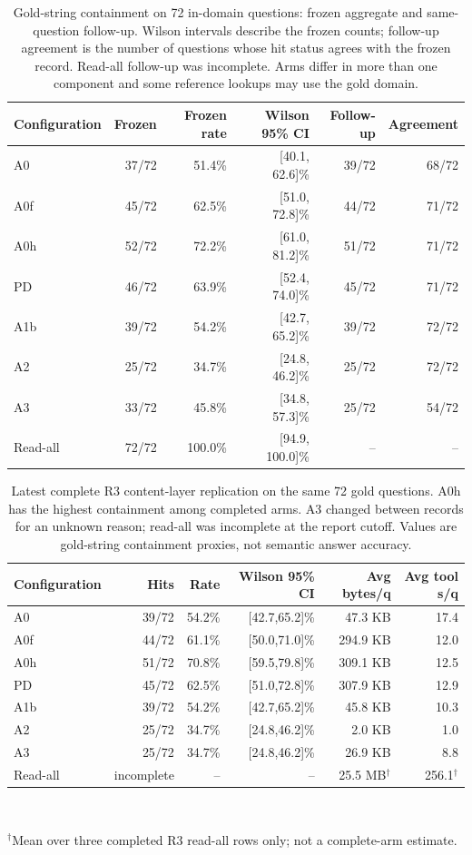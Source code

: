\begin{table}[t]
\centering\small
\caption{Gold-string containment on 72 in-domain questions: frozen aggregate and same-question follow-up. Wilson intervals describe the frozen counts; follow-up agreement is the number of questions whose hit status agrees with the frozen record. Read-all follow-up was incomplete. Arms differ in more than one component and some reference lookups may use the gold domain.}
\label{tab:s-arm-data}
\begin{tabular}{lrrrrr}
\toprule
Configuration & Frozen & Frozen rate & Wilson 95\% CI & Follow-up & Agreement \\
\midrule
A0 & 37/72 & 51.4\% & [40.1, 62.6]\% & 39/72 & 68/72 \\
A0f & 45/72 & 62.5\% & [51.0, 72.8]\% & 44/72 & 71/72 \\
A0h & 52/72 & 72.2\% & [61.0, 81.2]\% & 51/72 & 71/72 \\
PD & 46/72 & 63.9\% & [52.4, 74.0]\% & 45/72 & 71/72 \\
A1b & 39/72 & 54.2\% & [42.7, 65.2]\% & 39/72 & 72/72 \\
A2 & 25/72 & 34.7\% & [24.8, 46.2]\% & 25/72 & 72/72 \\
A3 & 33/72 & 45.8\% & [34.8, 57.3]\% & 25/72 & 54/72 \\
Read-all & 72/72 & 100.0\% & [94.9, 100.0]\% & -- & -- \\
\bottomrule
\end{tabular}
\end{table}
\begin{table}[t]
\centering\small
\caption{Latest complete R3 content-layer replication on the same 72 gold
questions. A0h has the highest containment among completed arms. A3 changed
between records for an unknown reason; read-all was incomplete at the report cutoff. Values are gold-string
containment proxies, not semantic answer accuracy.}
\label{tab:s-r3-content}
\begin{tabular}{lrrrrr}
\toprule
Configuration & Hits & Rate & Wilson 95\% CI & Avg bytes/q & Avg tool s/q \\
\midrule
A0 & 39/72 & 54.2\% & [42.7,65.2]\% & 47.3 KB & 17.4 \\
A0f & 44/72 & 61.1\% & [50.0,71.0]\% & 294.9 KB & 12.0 \\
A0h & 51/72 & 70.8\% & [59.5,79.8]\% & 309.1 KB & 12.5 \\
PD & 45/72 & 62.5\% & [51.0,72.8]\% & 307.9 KB & 12.9 \\
A1b & 39/72 & 54.2\% & [42.7,65.2]\% & 45.8 KB & 10.3 \\
A2 & 25/72 & 34.7\% & [24.8,46.2]\% & 2.0 KB & 1.0 \\
A3 & 25/72 & 34.7\% & [24.8,46.2]\% & 26.9 KB & 8.8 \\
Read-all & incomplete & -- & -- & 25.5 MB$^{\dagger}$ & 256.1$^{\dagger}$ \\
\bottomrule
\end{tabular}
\\[-2pt]
\parbox{0.97\textwidth}{\footnotesize $^{\dagger}$Mean over three completed R3 read-all rows only; not a complete-arm estimate.}
\end{table}
